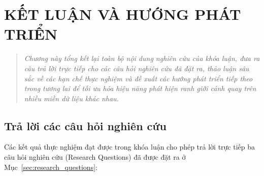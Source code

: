 \chapter{KẾT LUẬN VÀ HƯỚNG PHÁT TRIỂN}
\label{chuong5}
\label{ch:ket_luan}

\vspace{-1.5cm}

\begin{quotation}
    \noindent
    \small\textit{
    Chương này tổng kết lại toàn bộ nội dung nghiên cứu của khóa luận, đưa ra câu trả lời trực tiếp cho các câu hỏi nghiên cứu đã đặt ra, thảo luận sâu sắc về các hạn chế thực nghiệm và đề xuất các hướng phát triển tiếp theo trong tương lai để tối ưu hóa hiệu năng phát hiện ranh giới cảnh quay trên nhiều miền dữ liệu khác nhau.
    }
\end{quotation}
\vspace{1em}

\section{Trả lời các câu hỏi nghiên cứu}
\label{sec:rq_answers}
Các kết quả thực nghiệm đạt được trong khóa luận cho phép trả lời trực tiếp ba câu hỏi nghiên cứu (Research Questions) đã được đặt ra ở Mục~\ref{sec:research_questions}:

